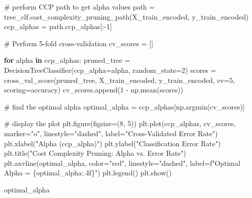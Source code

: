 \documentclass[
  letterpaper,
  DIV=11,
  numbers=noendperiod]{scrartcl}
\newenvironment{Shaded}{\begin{snugshade}}{\end{snugshade}}
\newcommand{\CommentTok}[1]{\textcolor[rgb]{0.37,0.37,0.37}{#1}}
\newcommand{\ControlFlowTok}[1]{\textcolor[rgb]{0.00,0.23,0.31}{\textbf{#1}}}
\newcommand{\DecValTok}[1]{\textcolor[rgb]{0.68,0.00,0.00}{#1}}
\newcommand{\KeywordTok}[1]{\textcolor[rgb]{0.00,0.23,0.31}{\textbf{#1}}}
\newcommand{\NormalTok}[1]{\textcolor[rgb]{0.00,0.23,0.31}{#1}}
\newcommand{\OperatorTok}[1]{\textcolor[rgb]{0.37,0.37,0.37}{#1}}
\newcommand{\SpecialCharTok}[1]{\textcolor[rgb]{0.37,0.37,0.37}{#1}}
\newcommand{\SpecialStringTok}[1]{\textcolor[rgb]{0.13,0.47,0.30}{#1}}
\newcommand{\StringTok}[1]{\textcolor[rgb]{0.13,0.47,0.30}{#1}}
\begin{document}
\begin{Shaded}
\begin{Highlighting}[]
\CommentTok{\# perform CCP path to get alpha values}
\NormalTok{path }\OperatorTok{=}\NormalTok{ tree\_clf.cost\_complexity\_pruning\_path(X\_train\_encoded, y\_train\_encoded)}
\NormalTok{ccp\_alphas }\OperatorTok{=}\NormalTok{ path.ccp\_alphas[:}\OperatorTok{{-}}\DecValTok{1}\NormalTok{]}

\CommentTok{\# Perform 5{-}fold cross{-}validation}
\NormalTok{cv\_scores }\OperatorTok{=}\NormalTok{ []}

\ControlFlowTok{for}\NormalTok{ alpha }\KeywordTok{in}\NormalTok{ ccp\_alphas:}
\NormalTok{    pruned\_tree }\OperatorTok{=}\NormalTok{ DecisionTreeClassifier(ccp\_alpha}\OperatorTok{=}\NormalTok{alpha, random\_state}\OperatorTok{=}\DecValTok{2}\NormalTok{)}
\NormalTok{    scores }\OperatorTok{=}\NormalTok{ cross\_val\_score(pruned\_tree, X\_train\_encoded,}
\NormalTok{                             y\_train\_encoded, cv}\OperatorTok{=}\DecValTok{5}\NormalTok{, scoring}\OperatorTok{=}\StringTok{\textquotesingle{}accuracy\textquotesingle{}}\NormalTok{)}
\NormalTok{    cv\_scores.append(}\DecValTok{1} \OperatorTok{{-}}\NormalTok{ np.mean(scores))}

\CommentTok{\# find the optimal alpha}
\NormalTok{optimal\_alpha }\OperatorTok{=}\NormalTok{ ccp\_alphas[np.argmin(cv\_scores)]}

\CommentTok{\# display the plot}
\NormalTok{plt.figure(figsize}\OperatorTok{=}\NormalTok{(}\DecValTok{8}\NormalTok{, }\DecValTok{5}\NormalTok{))}
\NormalTok{plt.plot(ccp\_alphas, cv\_scores, marker}\OperatorTok{=}\StringTok{"o"}\NormalTok{, linestyle}\OperatorTok{=}\StringTok{"dashed"}\NormalTok{,}
\NormalTok{         label}\OperatorTok{=}\StringTok{"Cross{-}Validated Error Rate"}\NormalTok{)}
\NormalTok{plt.xlabel(}\StringTok{"Alpha (ccp\_alpha)"}\NormalTok{)}
\NormalTok{plt.ylabel(}\StringTok{"Classification Error Rate"}\NormalTok{)}
\NormalTok{plt.title(}\StringTok{"Cost Complexity Pruning: Alpha vs. Error Rate"}\NormalTok{)}
\NormalTok{plt.axvline(optimal\_alpha, color}\OperatorTok{=}\StringTok{"red"}\NormalTok{, linestyle}\OperatorTok{=}\StringTok{"dashed"}\NormalTok{,}
\NormalTok{            label}\OperatorTok{=}\SpecialStringTok{f"Optimal Alpha = }\SpecialCharTok{\{}\NormalTok{optimal\_alpha}\SpecialCharTok{:.4f\}}\SpecialStringTok{"}\NormalTok{)}
\NormalTok{plt.legend()}
\NormalTok{plt.show()}

\NormalTok{optimal\_alpha}
\end{Highlighting}
\end{Shaded}
\end{document}
